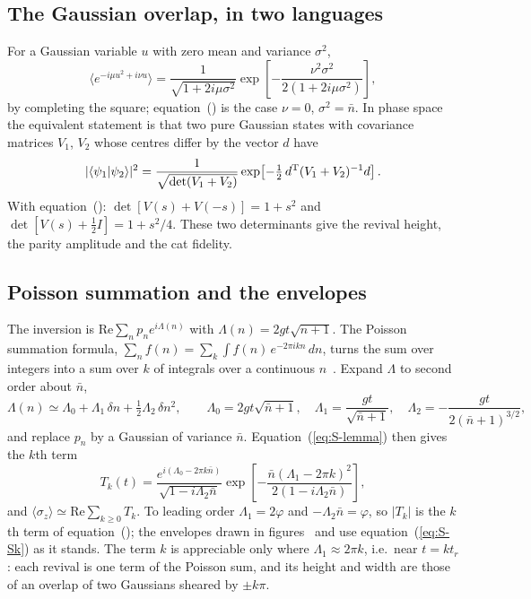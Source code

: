 \documentclass{iopjournal}
\newcommand{\nbar}{\bar{n}}
\newcommand{\braket}[2]{\langle #1|#2\rangle}
\begin{document}
\subsection{The Gaussian overlap, in two languages}
For a Gaussian variable $u$ with zero mean and variance $\sigma^2$,
\begin{equation}
\big\langle e^{-i\mu u^2 + i\nu u}\big\rangle = \frac{1}{\sqrt{1+2i\mu\sigma^2}}\exp\!\left[-\frac{\nu^2\sigma^2}{2(1+2i\mu\sigma^2)}\right],
\label{eq:S-lemma}
\end{equation}
by completing the square; equation~() is the case $\nu = 0$, $\sigma^2 = \nbar$. In phase space the equivalent statement is that two pure Gaussian states with covariance matrices $V_1$, $V_2$ whose centres differ by the vector $d$ have
\begin{equation}
|\braket{\psi_1}{\psi_2}|^2 = \frac{1}{\sqrt{\det(V_1+V_2)}}\exp\!\left[-\tfrac12\,d^{\rm T}(V_1+V_2)^{-1}d\right].
\label{eq:S-overlap}
\end{equation}
With equation~(): $\det[V(s)+V(-s)] = 1+s^2$ and $\det[V(s)+\tfrac12 I] = 1+s^2/4$. These two determinants give the revival height, the parity amplitude and the cat fidelity.

\subsection{Poisson summation and the envelopes}
The inversion is $\mathrm{Re}\sum_n p_n e^{i\Lambda(n)}$ with $\Lambda(n) = 2gt\sqrt{n+1}$. The Poisson summation formula, $\sum_n f(n) = \sum_k\int f(n)\,e^{-2\pi ikn}\,dn$, turns the sum over integers into a sum over $k$ of integrals over a continuous $n$~\cite{S-fleischhauer1993}. Expand $\Lambda$ to second order about $\nbar$,
\begin{equation}
\Lambda(n) \simeq \Lambda_0 + \Lambda_1\,\delta n + \tfrac12\Lambda_2\,\delta n^2,\qquad
\Lambda_0 = 2gt\sqrt{\nbar+1},\quad \Lambda_1 = \frac{gt}{\sqrt{\nbar+1}},\quad \Lambda_2 = -\frac{gt}{2(\nbar+1)^{3/2}},
\end{equation}
and replace $p_n$ by a Gaussian of variance $\nbar$. Equation~(\ref{eq:S-lemma}) then gives the $k$th term
\begin{equation}
T_k(t) = \frac{e^{i(\Lambda_0-2\pi k\nbar)}}{\sqrt{1-i\Lambda_2\nbar}}\exp\!\left[-\frac{\nbar(\Lambda_1-2\pi k)^2}{2(1-i\Lambda_2\nbar)}\right],
\label{eq:S-Sk}
\end{equation}
and $\langle\sigma_z\rangle\simeq\mathrm{Re}\sum_{k\geq0}T_k$. To leading order $\Lambda_1 = 2\varphi$ and $-\Lambda_2\nbar = \varphi$, so $|T_k|$ is the $k$th term of equation~(); the envelopes drawn in figures~ and  use equation~(\ref{eq:S-Sk}) as it stands. The term $k$ is appreciable only where $\Lambda_1\approx 2\pi k$, i.e.\ near $t = kt_r$: each revival is one term of the Poisson sum, and its height and width are those of an overlap of two Gaussians sheared by $\pm k\pi$.
\end{document}
